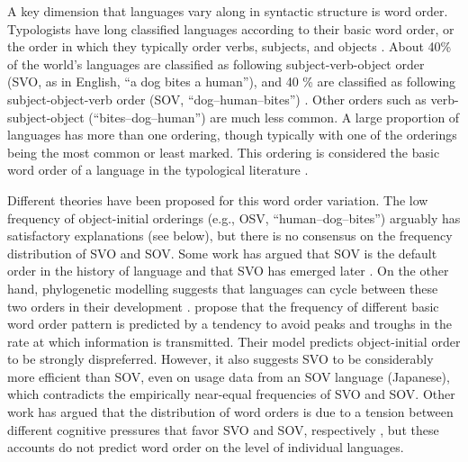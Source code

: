 \documentclass[11pt,a4paper]{article}
\begin{document}
A key dimension that languages vary along in syntactic structure is word order.
Typologists have long classified languages according to their basic word order, or the order in which they typically order verbs, subjects, and objects \citep{greenberg-universals-1963}.
About 40\% of the world's languages are classified as following subject-verb-object order ({SVO}, as in English, ``a dog bites a human''), and 40 \% are classified as following subject-object-verb order ({SOV}, ``dog--human--bites'') \citep{wals-81}.
Other orders such as verb-subject-object (``bites--dog--human'') are much less common.
A large proportion of languages has more than one ordering, though typically with one of the orderings being the most common or least marked.
This ordering is considered the  basic word order of a language in the typological literature \citep{greenberg-universals-1963, wals-s6}.


Different theories have been proposed for this word order variation.
The low frequency of object-initial orderings (e.g., OSV, ``human--dog--bites'') arguably has satisfactory explanations (see below), but there is no consensus on the frequency distribution of SVO and SOV.
Some work has argued that SOV is the default order in the history of language and that SVO has emerged later \citep{givon1979understanding,senghas1997argument, newmeyer2000evolutionary, goldin-meadow2008natural, gibson-noisy-channel-2013}.
On the other hand, phylogenetic modelling suggests that languages can cycle between these two orders in their development \citep{maurits2014tracing}.
\cite{maurits2010why} propose that the frequency of different basic word order pattern is predicted by a tendency to avoid peaks and troughs in the rate at which information is transmitted.
Their model predicts object-initial order to be strongly dispreferred.
However, it also suggests SVO to be considerably more efficient than SOV, even on usage data from an SOV language (Japanese), which contradicts the empirically near-equal frequencies of SVO and SOV.
Other work has argued that the distribution of word orders is due to a tension between different cognitive pressures that favor SVO and SOV, respectively \citep{langus2010cognitive, ferrer-i-cancho-placement-2017}, but these accounts do not predict word order on the level of individual languages. 

\end{document}
